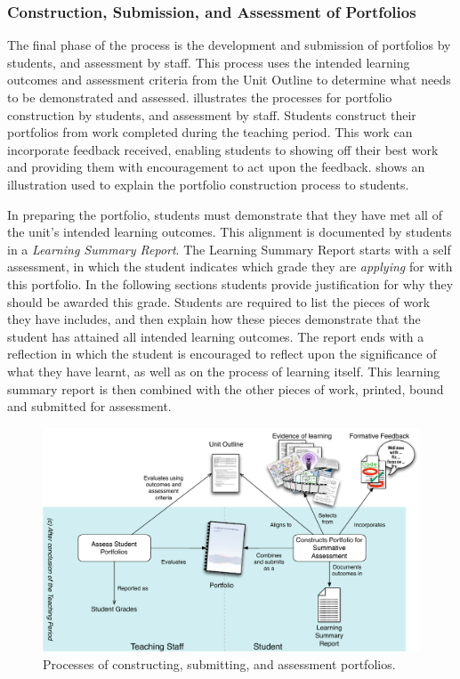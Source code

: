 
\subsubsection{Construction, Submission, and Assessment of Portfolios} %
\label{ssub:construction_submission_and_assessment_of_portfolios}

The final phase of the process is the development and submission of portfolios by students, and assessment by staff. This process uses the intended learning outcomes and assessment criteria from the Unit Outline to determine what needs to be demonstrated and assessed.  illustrates the processes for portfolio construction by students, and assessment by staff. Students construct their portfolios from work completed during the teaching period. This work can incorporate feedback received, enabling students to showing off their best work and providing them with encouragement to act upon the feedback.  shows an illustration used to explain the portfolio construction process to students. 

In preparing the portfolio, students must demonstrate that they have met all of the unit's intended learning outcomes. This alignment is documented by students in a \emph{Learning Summary Report}. The Learning Summary Report starts with a self assessment, in which the student indicates which grade they are \emph{applying} for with this portfolio. In the following sections students provide justification for why they should be awarded this grade. Students are required to list the pieces of work they have includes, and then explain how these pieces demonstrate that the student has attained all intended learning outcomes. The report ends with a reflection in which the student is encouraged to reflect upon the significance of what they have learnt, as well as on the process of learning itself. This learning summary report is then combined with the other pieces of work, printed, bound and submitted for assessment.

\begin{figure}[p]
	\centering
	\includegraphics[width=\textwidth]{PortfolioConstructionAssessment}
	\caption{Processes of constructing, submitting, and assessment portfolios.}
	\label{fig:portfolio_processes}
\end{figure}

